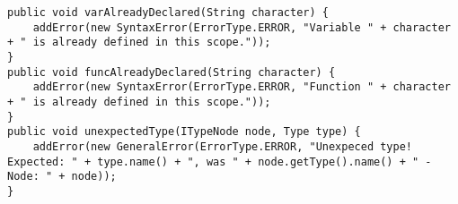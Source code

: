 \begin{lstlisting}[caption={three different error messages from the ErrorHandler class}, label={eh04}]
public void varAlreadyDeclared(String character) {
    addError(new SyntaxError(ErrorType.ERROR, "Variable " + character + " is already defined in this scope."));
}
public void funcAlreadyDeclared(String character) {
    addError(new SyntaxError(ErrorType.ERROR, "Function " + character + " is already defined in this scope."));
}
public void unexpectedType(ITypeNode node, Type type) {
    addError(new GeneralError(ErrorType.ERROR, "Unexpeced type! Expected: " + type.name() + ", was " + node.getType().name() + " - Node: " + node));
}
\end{lstlisting}